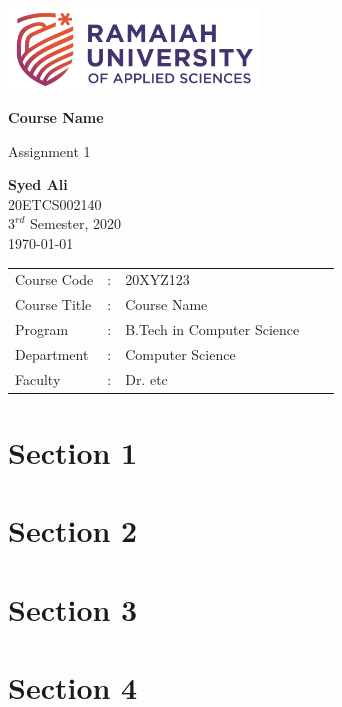 \documentclass[12pt]{article}
\newcommand{\Course}{Course Name}
\newcommand{\Name}{Syed Ali}
\newcommand{\Regno}{20ETCS002140}
\newcommand{\Batch}{$3^{rd}$ Semester, 2020}
\newcommand{\Date}{\today}
\newcommand{\Courseno}{20XYZ123}
\newcommand{\Program}{B.Tech in Computer Science}
\newcommand{\Department}{Computer Science}
\newcommand{\Faculty}{Dr. etc}
\begin{document}
\onehalfspacing
\begin{titlepage}

  \begin{center}
    \vspace*{\fill}
    \includegraphics[width=0.5\textwidth]{images/school logo.png}
    \vspace{1cm}

    \Huge
    \textbf{\Course}

    \vspace{0.5cm}
    \LARGE
    Assignment 1

    \vspace{1cm}

    \textbf{\Name}
    \vspace{0.5cm}\\
    \Large
    \Regno\\
    \Batch\\
    \Date
    \vspace{1.5cm}

  \end{center}
  \begin{center}
    \Large
    \begin{tabular}{ l l l l l }
      Course Code  & : & \Courseno   \\
      Course Title & : & \Course     \\
      Program      & : & \Program    \\
      Department   & : & \Department \\
      Faculty      & : & \Faculty
    \end{tabular}
  \end{center}
  \vspace*{\fill}
\end{titlepage}

% 

\tableofcontents
\newpage

\section{Section 1}

\newpage

\section{Section 2}

\newpage

\section{Section 3}

\newpage

\section{Section 4}


% 
% 
\end{document}
